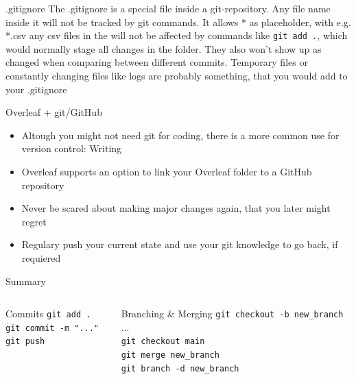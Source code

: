 \documentclass[en]{sdqbeamer}
\begin{document}
\begin{frame}{.gitignore}
The .gitignore is a special file inside a git-repository. Any file name inside it will not be tracked by git commands. It allows * as placeholder, with e.g. *.csv any csv files in the will not be affected by commands like \lstinline{git add .}, which would normally stage all changes in the folder. They also won't show up as changed when comparing between different commits. Temporary files or constantly changing files like logs are probably something, that you would add to your .gitignore
\end{frame}

\begin{frame}{Overleaf + git/GitHub}
\begin{itemize}
    \item Altough you might not need git for coding, there is a more common use for version control: Writing
    \item Overleaf supports an option to link your Overleaf folder to a GitHub repository
    \item Never be scared about making major changes again, that you later might regret
    \item Regulary push your current state and use your git knowledge to go back, if requiered
\end{itemize}
    
\end{frame}

\begin{frame}{Summary}
\begin{columns}[t]
\begin{column}{0.45\textwidth}
\begin{block}{Commits}
\lstinline{git add .}\\
\lstinline{git commit -m "..."}\\
\lstinline{git push}
\end{block}
\end{column}

\begin{column}{0.45\textwidth}
\begin{block}{Branching \& Merging}
\lstinline{git checkout -b new_branch}\\
...\\
\lstinline{git checkout main}\\
\lstinline{git merge new_branch}\\
\lstinline{git branch -d new_branch}
\end{block}
\end{column}
\end{columns}
    
\end{frame}
\end{document}
